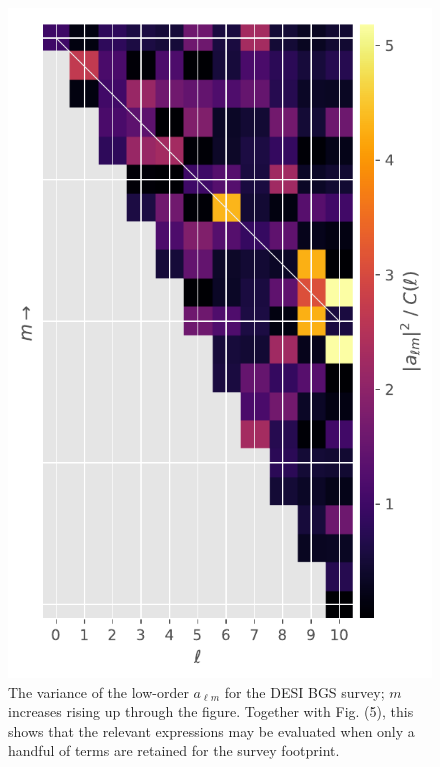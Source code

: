 \documentclass[useAMS,usenatbib]{mn2e}
\begin{document}
\begin{figure}
    \centering
    \includegraphics[scale=0.75]{desi_alms.pdf}
    \caption{The variance of the low-order $a_{\ell m}$ for the DESI BGS survey; $m$ increases rising up through the figure.  Together with Fig. (5), this shows that the relevant expressions may be evaluated when only a handful of terms are retained for the survey footprint.}
    \label{fig:alms}
\end{figure}
\end{document}
